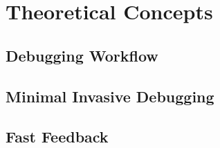 \chapter{Theoretical Concepts}

\section{Debugging Workflow}
\section{Minimal Invasive Debugging}
\section{Fast Feedback}
